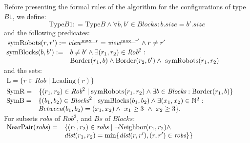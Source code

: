 \medskip Before presenting the formal rules of the algorithm for the
configurations of type $B1$, we define: 
$$\text{Type}B1 : = \text{Type}B \wedge 
\forall b, b' \in \textit{Blocks}: b.\textit{size} = b'.\textit{size}$$ 
and the following predicates: \\
$\begin{array}{l} \text{symRobots}(r, r') : = \mathit{view}^{\text{max}\_{r}} =
\mathit{view}^{\text{max}\_{r'}} \wedge  r \neq r' \end{array}$\\
$\begin{array}{l l} \!\text{symBlocks}(b, b'): = 
& b\neq b' \wedge  \exists  (r_1, r_2)
\in \textit{Rob}^2: \\ &\textrm{Border}(r_1, b) \wedge 
\textrm{Border}(r_2, b') \wedge \ \text{symRobots}(r_1, r_2) \end{array}$\\
and the sets: \\
$\begin{array}{l} \text{L} = \{ r \in \textit{Rob} \mid  \textrm{Leading}(r) \}\end{array}$\\
$\begin{array}{l l} \! \textrm{SymR} = 
& \{(r_1, r_2) \in \textit{Rob}^2 \mid \text{symRobots}(r_1, r_2) \wedge 
 \exists b \in \textit{Blocks}: \textrm{Border}(r_1, b)\} \end{array}$\\ 
$\begin{array}{l l} \!\text{SymB} = &
\{(b_1, b_2)  \in \textit{Blocks}^2 \mid \text{symBlocks}(b_1, b_2)
\wedge \exists (x_1, x_2) \in \mathbb{N}^2: \\& \textit{Between}(b_1, b_2) =  
(x_1, x_2) \land \ x_1 \geq 3 \ \wedge \ x_2 \geq 3 \}. \end{array}$\\ 
For subsets $\textit{robs}$ of $\textit{Rob}^2$, and $\textit{Bs}$ 
of $\textit{Blocks}$: \\
$\begin{array}{l l}\!\text{NearPair}(\textit{robs}
)=&\{(r_1, r_2) \in \textit{robs} \mid  \neg \textrm{Neighbor}(r_1, r_2) \wedge \\ &  
 \textit{dist}(r_1, r_2) =\min \{\textit{dist}(r, r'),  (r, r') \in \textit{robs}\} \}\\ \end{array} $\\
